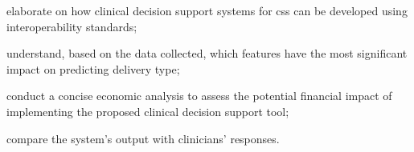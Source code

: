 \begin{myitemize}
    \item elaborate on how clinical decision support systems for \acp{cs} can be developed using interoperability standards;
    \item understand, based on the data collected, which features have the most significant impact on predicting delivery type;
    \item conduct a concise economic analysis to assess the potential financial impact of implementing the proposed clinical decision support tool;
    \item compare the system's output with clinicians' responses.

\end{myitemize}